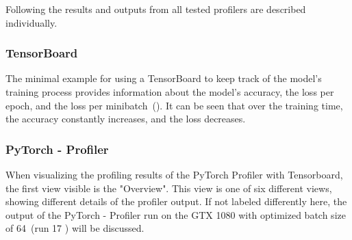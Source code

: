 \documentclass[12pt, a4paper, hidelinks]{article}
\begin{document}
Following the results and outputs from all tested profilers are described individually.

\subsubsection{TensorBoard}
\label{sec:r-tensorboard}

The minimal example for using a TensorBoard to keep track of the model's training process provides information about the model's accuracy, the loss per epoch, and the loss per minibatch~(). It can be seen that over the training time, the accuracy constantly increases, and the loss decreases.

\subsubsection{PyTorch - Profiler}
\label{sec:r-pytorch-profiler}

When visualizing the profiling results of the PyTorch Profiler with Tensorboard, the first view visible is the "Overview". This view is one of six different views, showing different details of the profiler output. If not labeled differently here, the output of the PyTorch - Profiler run on the GTX 1080 with optimized batch size of 64~(run 17 ) will be discussed.
\end{document}
